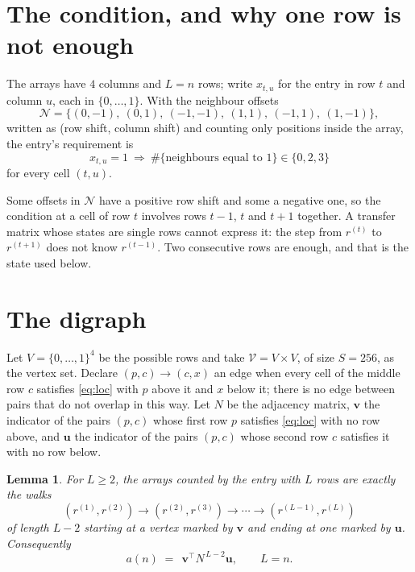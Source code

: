 \documentclass[11pt,a4paper]{article}
\theoremstyle{plain}
\newtheorem{lemma}[theorem]{Lemma}
\theoremstyle{definition}
\begin{document}
\section{The condition, and why one row is not enough}

The arrays have $4$ columns and $L=n$ rows; write $x_{t,u}$ for the entry in
row $t$ and column $u$, each in $\{0,\dots,1\}$. With the neighbour offsets
\[
\mathcal N=\{(0,-1),\ (0,1),\ (-1,-1),\ (1,1),\ (-1,1),\ (1,-1)\},
\]
written as (row shift, column shift) and counting only positions inside the array, the
entry's requirement is
\begin{equation}\label{eq:loc}
x_{t,u}=1\ \Rightarrow\ \#\{\text{neighbours equal to }1\}\in\{0,2,3\}
\end{equation}
for every cell $(t,u)$.

Some offsets in $\mathcal N$ have a positive row shift and some a negative one, so the
condition at a cell of row $t$ involves rows $t-1$, $t$ and $t+1$ together. A transfer
matrix whose states are single rows cannot express it: the step from $r^{(t)}$ to
$r^{(t+1)}$ does not know $r^{(t-1)}$. Two consecutive rows are enough, and that is
the state used below.

\section{The digraph}

Let $V=\{0,\dots,1\}^{4}$ be the possible rows and take
$\mathcal V=V\times V$, of size $S=256$, as the vertex set. Declare $(p,c)\to(c,x)$ an edge
when every cell of the middle row $c$ satisfies \eqref{eq:loc} with $p$ above it and $x$
below it; there is no edge between pairs that do not overlap in this way. Let $N$ be the
adjacency matrix, $\mathbf{v}$ the indicator of the pairs $(p,c)$ whose first row $p$
satisfies \eqref{eq:loc} with no row above, and $\mathbf{u}$ the indicator of
the pairs $(p,c)$ whose second row $c$ satisfies it with no row below.

\begin{lemma}\label{lem:walk}
For $L\ge2$, the arrays counted by the entry with $L$ rows are exactly the walks
\[
(r^{(1)},r^{(2)})\to(r^{(2)},r^{(3)})\to\cdots\to(r^{(L-1)},r^{(L)})
\]
of length $L-2$ starting at a vertex marked by $\mathbf{v}$ and ending at one marked by
$\mathbf{u}$. Consequently
\[
a(n)\;=\;\,\mathbf{v}^{\!\top}N^{\,L-2}\mathbf{u},\qquad L=n .
\]
\end{lemma}
\end{document}
